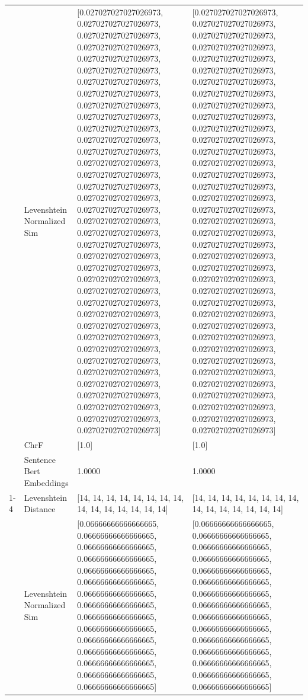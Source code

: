 \begin{tabular}{llll}
 & Levenshtein Normalized Sim & [0.027027027027026973, 0.027027027027026973, 0.027027027027026973, 0.027027027027026973, 0.027027027027026973, 0.027027027027026973, 0.027027027027026973, 0.027027027027026973, 0.027027027027026973, 0.027027027027026973, 0.027027027027026973, 0.027027027027026973, 0.027027027027026973, 0.027027027027026973, 0.027027027027026973, 0.027027027027026973, 0.027027027027026973, 0.027027027027026973, 0.027027027027026973, 0.027027027027026973, 0.027027027027026973, 0.027027027027026973, 0.027027027027026973, 0.027027027027026973, 0.027027027027026973, 0.027027027027026973, 0.027027027027026973, 0.027027027027026973, 0.027027027027026973, 0.027027027027026973, 0.027027027027026973, 0.027027027027026973, 0.027027027027026973, 0.027027027027026973, 0.027027027027026973, 0.027027027027026973, 0.027027027027026973] & [0.027027027027026973, 0.027027027027026973, 0.027027027027026973, 0.027027027027026973, 0.027027027027026973, 0.027027027027026973, 0.027027027027026973, 0.027027027027026973, 0.027027027027026973, 0.027027027027026973, 0.027027027027026973, 0.027027027027026973, 0.027027027027026973, 0.027027027027026973, 0.027027027027026973, 0.027027027027026973, 0.027027027027026973, 0.027027027027026973, 0.027027027027026973, 0.027027027027026973, 0.027027027027026973, 0.027027027027026973, 0.027027027027026973, 0.027027027027026973, 0.027027027027026973, 0.027027027027026973, 0.027027027027026973, 0.027027027027026973, 0.027027027027026973, 0.027027027027026973, 0.027027027027026973, 0.027027027027026973, 0.027027027027026973, 0.027027027027026973, 0.027027027027026973, 0.027027027027026973, 0.027027027027026973] \\
 & ChrF & [1.0] & [1.0] \\
 & Sentence Bert Embeddings & 1.0000 & 1.0000 \\
\cline{1-4}
\multirow[t]{4}{*}{Nyomba nka nigo ere engencho.} & Levenshtein Distance & [14, 14, 14, 14, 14, 14, 14, 14, 14, 14, 14, 14, 14, 14, 14] & [14, 14, 14, 14, 14, 14, 14, 14, 14, 14, 14, 14, 14, 14, 14] \\
 & Levenshtein Normalized Sim & [0.06666666666666665, 0.06666666666666665, 0.06666666666666665, 0.06666666666666665, 0.06666666666666665, 0.06666666666666665, 0.06666666666666665, 0.06666666666666665, 0.06666666666666665, 0.06666666666666665, 0.06666666666666665, 0.06666666666666665, 0.06666666666666665, 0.06666666666666665, 0.06666666666666665] & [0.06666666666666665, 0.06666666666666665, 0.06666666666666665, 0.06666666666666665, 0.06666666666666665, 0.06666666666666665, 0.06666666666666665, 0.06666666666666665, 0.06666666666666665, 0.06666666666666665, 0.06666666666666665, 0.06666666666666665, 0.06666666666666665, 0.06666666666666665, 0.06666666666666665] \\

\end{tabular}
